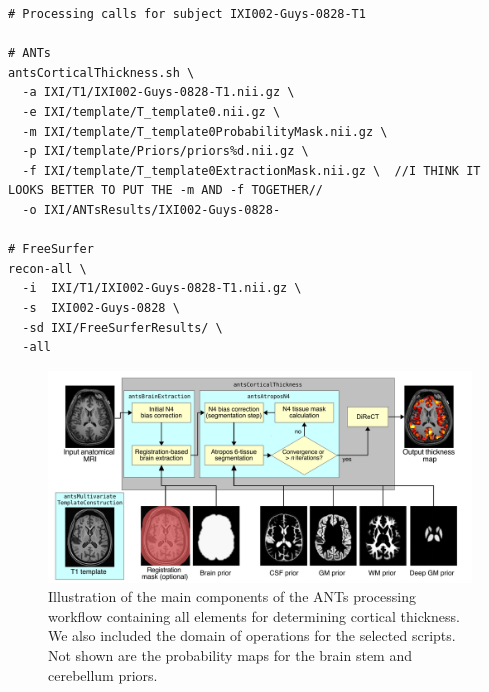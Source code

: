 \begin{lstlisting}
# Processing calls for subject IXI002-Guys-0828-T1

# ANTs
antsCorticalThickness.sh \
  -a IXI/T1/IXI002-Guys-0828-T1.nii.gz \
  -e IXI/template/T_template0.nii.gz \
  -m IXI/template/T_template0ProbabilityMask.nii.gz \
  -p IXI/template/Priors/priors%d.nii.gz \
  -f IXI/template/T_template0ExtractionMask.nii.gz \  //I THINK IT LOOKS BETTER TO PUT THE -m AND -f TOGETHER//
  -o IXI/ANTsResults/IXI002-Guys-0828-

# FreeSurfer  
recon-all \
  -i  IXI/T1/IXI002-Guys-0828-T1.nii.gz \
  -s  IXI002-Guys-0828 \
  -sd IXI/FreeSurferResults/ \
  -all
\end{lstlisting}



\begin{figure}
  \centering
  \includegraphics[width=180mm]{Figures/Kapowski_pipeline2.pdf}
  \caption{Illustration of the main components of the ANTs processing 
  workflow containing all elements for determining cortical thickness. 
  We also included the domain of operations for the selected scripts.
  Not shown are the probability maps for the brain stem and cerebellum
  priors.}
  \label{fig:pipeline}
\end{figure}

